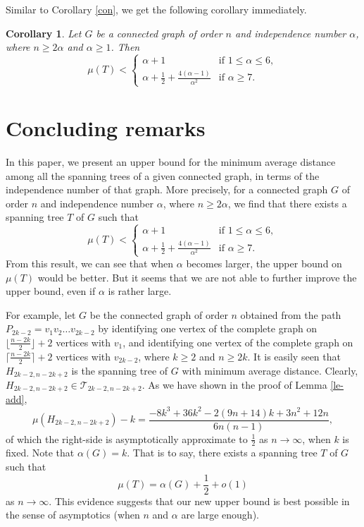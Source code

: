 \documentclass[12pt]{article}
\newtheorem{Corollary}{Corollary}[section]
\begin{document}
Similar to Corollary \ref{con}, we get the following corollary immediately.

\begin{Corollary} \label{cor-1}
Let $G$ be a connected graph of order $n$ and independence number $\alpha$, where $n \ge 2 \alpha$ and $\alpha \ge 1$. Then
$$
\renewcommand{\arraystretch}{1.2}
\mu(T) < \left\{\begin{array}{ll}
\alpha + 1  & \mbox{if $1 \le \alpha \le 6$},\\
 \alpha + \frac{1}{2} + \frac{4(\alpha-1)}{\alpha^2}
 & \mbox{if $\alpha \ge 7$}.
\end{array}
\right.
$$
\end{Corollary}



\section{Concluding remarks}

In this paper, we present an upper bound for the minimum average distance among all the spanning trees of a given connected graph, in terms of the independence number of that graph. More precisely, for a connected graph $G$ of order $n$ and independence number $\alpha$, where $n \ge 2 \alpha$, we find that there exists a spanning tree $T$ of $G$ such that
$$
\renewcommand{\arraystretch}{1.2}
\mu(T) < \left\{\begin{array}{ll}
\alpha + 1  & \mbox{if $1 \le \alpha \le 6$},\\
 \alpha + \frac{1}{2} + \frac{4(\alpha-1)}{\alpha^2}
 & \mbox{if $\alpha \ge 7$}.
\end{array}
\right.
$$
From this result, we can see that when $\alpha$ becomes larger, the upper bound on $\mu(T)$ would be better.
But it seems that we are not able to further improve the upper bound, even if $\alpha$ is rather large.

For example, let $G$ be the connected graph of order $n$ obtained from the path $P_{2k-2} = v_1 v_2 \dots v_{2k-2}$ by identifying one vertex of the complete graph on $\lfloor\frac{n-2k}{2} \rfloor + 2$ vertices with $v_1$, and identifying one vertex of the complete graph on $\lceil\frac{n-2k}{2} \rceil + 2$ vertices with $v_{2k-2}$, where $k \ge 2$ and $n \ge 2k$. It is easily seen that $H_{2k-2,n-2k+2}$ is the spanning tree of $G$ with minimum average distance. Clearly, $H_{2k-2,n-2k+2} \in \mathcal{T}_{2k - 2, n - 2k + 2}$. As we have shown in the proof of Lemma \ref{le-add},
$$
\mu(H_{2k-2,n-2k+2}) - k =  \frac{-8k ^3 + 36 k^2 - 2( 9 n + 14 ) k  + 3 n^2 + 12n }{6 n (n-1)},
$$
of which the right-side is asymptotically approximate to $\frac{1}{2}$ as $n \rightarrow \infty$, when $k$ is fixed. Note that $\alpha(G) = k$. That is to say, there exists a spanning tree $T$ of $G$ such that
$$
\mu(T) = \alpha(G) + \frac{1}{2} + o(1)
$$
as $n \rightarrow \infty$. This evidence suggests
that our new upper bound is best possible in the sense of asymptotics (when $n$ and $\alpha$ are large enough).
\end{document}
